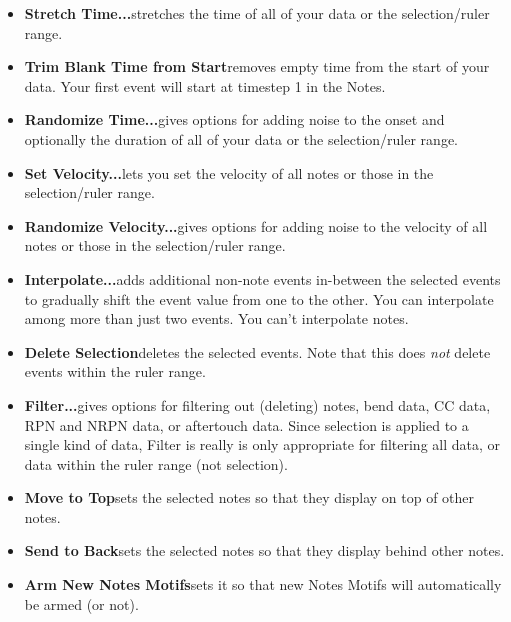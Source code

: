 \documentclass[twoside,10pt]{article}
\begin{document}
\begin{itemize}
\item{\bf Stretch Time...}\quad stretches the time of all of your data or the selection/ruler range.

\item{\bf Trim Blank Time from Start}\quad removes empty time from the start of your data.  Your first event will start at timestep 1 in the Notes.

\item{\bf Randomize Time...}\quad gives options for adding noise to the onset and optionally the duration of all of your data or the selection/ruler range.

\item{\bf Set Velocity...}\quad lets you set the velocity of all notes or those in the selection/ruler range.

\item{\bf Randomize Velocity...}\quad gives options for adding noise to the velocity of all notes or those in the selection/ruler range.

\item{\bf Interpolate...}\quad adds additional non-note events in-between the selected events to gradually shift the event value from one to the other.  You can interpolate among more than just two events.  You can't interpolate notes.

\item{\bf Delete Selection}\quad deletes the selected events.  Note that this does {\it not} delete events within the ruler range.

\item{\bf Filter...}\quad gives options for filtering out (deleting) notes, bend data, CC data, RPN and NRPN data, or aftertouch data.  Since selection is applied to a single kind of data, Filter is really is only appropriate for filtering all data, or data within the ruler range (not selection).

\item{\bf Move to Top}\quad sets the selected notes so that they display on top of other notes.

\item{\bf Send to Back}\quad sets the selected notes so that they display behind other notes.

\item{\bf Arm New Notes Motifs}\quad sets it so that new Notes Motifs will automatically be armed (or not).

\end{itemize}
\end{document}
